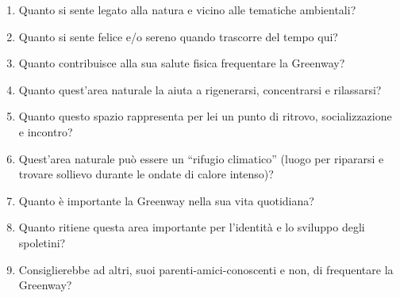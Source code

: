 \documentclass[
  a4paper,
]{book}
\begin{document}
\begin{enumerate}
\def\labelenumi{\arabic{enumi}.}
\item
  Quanto si sente legato alla natura e vicino alle tematiche ambientali?
\item
  Quanto si sente felice e/o sereno quando trascorre del tempo qui?
\item
  Quanto contribuisce alla sua salute fisica frequentare la Greenway?
\item
  Quanto quest'area naturale la aiuta a rigenerarsi, concentrarsi e rilassarsi?
\item
  Quanto questo spazio rappresenta per lei un punto di ritrovo, socializzazione e incontro?
\item
  Quest'area naturale può essere un ``rifugio climatico'' (luogo per ripararsi e trovare sollievo durante le ondate di calore intenso)?
\item
  Quanto è importante la Greenway nella sua vita quotidiana?
\item
  Quanto ritiene questa area importante per l'identità e lo sviluppo degli spoletini?
\item
  Consiglierebbe ad altri, suoi parenti-amici-conoscenti e non, di frequentare la Greenway?
\end{enumerate}
\end{document}
